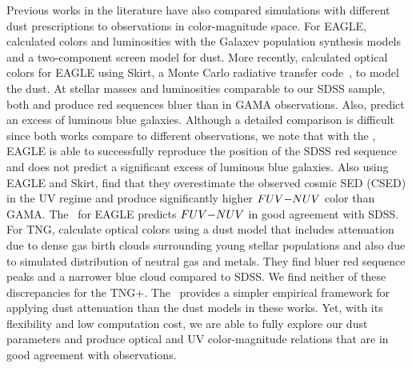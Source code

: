 Previous works in the literature have also compared simulations with different
dust prescriptions to observations in color-magnitude space. For EAGLE, 
\cite{trayford2015} calculated colors and luminosities with the {\sc Galaxev}
population synthesis models and a two-component screen model for dust. More
recently, \cite{trayford2017} calculated optical colors for EAGLE using {\sc
Skirt}, a Monte Carlo radiative transfer code~\citep{camps2015}, to model the
dust. At stellar masses and luminosities comparable to our SDSS sample, both 
\cite{trayford2015} and \cite{trayford2017} produce red sequences bluer than 
in GAMA observations. Also, \cite{trayford2015} predict an excess of luminous 
blue galaxies. Although a detailed comparison is difficult since both works 
compare to different observations, we note that with the \eda, EAGLE is able 
to successfully reproduce the position of the SDSS red sequence and does not 
predict a significant excess of luminous blue galaxies. Also using EAGLE and 
{\sc Skirt}, \cite{baes2019} find that they overestimate the observed cosmic 
SED (CSED) in the UV regime and produce significantly higher $FUV{-}NUV$ color 
than GAMA. The \eda~for EAGLE predicts $FUV{-}NUV$ in good agreement with SDSS. 
For TNG, \cite{nelson2018} calculate optical colors using a dust model that
includes attenuation due to dense gas birth clouds surrounding young stellar
populations and also due to simulated distribution of neutral gas and metals.
They find bluer red sequence peaks and a narrower blue cloud compared to SDSS.
We find neither of these discrepancies for the TNG+\eda. The \eda~provides a
simpler empirical framework for applying dust attenuation than the dust models
in these works. 
Yet, with its flexibility and low computation cost, we are able to fully
explore our dust parameters and produce optical and UV color-magnitude
relations that are in good agreement with observations.

 

 






